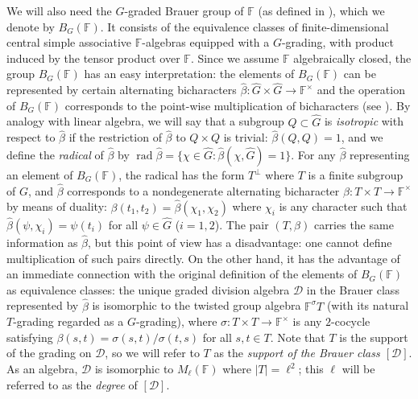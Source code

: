 \documentclass[a4paper,reqno]{amsart}
\theoremstyle{definition}
\numberwithin{theorem}{section}
\numberwithin{equation}{section}
\begin{document}
We will also need the $G$-graded Brauer group of ${\mathbb{F}}$ (as defined in \cite{PP}), which we denote by $B_G({\mathbb{F}})$. It consists of the equivalence classes of finite-dimensional central simple associative ${\mathbb{F}}$-algebras equipped with a $G$-grading, with product induced by the tensor product over ${\mathbb{F}}$. Since we assume ${\mathbb{F}}$ algebraically closed, the group $B_G({\mathbb{F}})$ has an easy interpretation: the elements of $B_G({\mathbb{F}})$ can be represented by certain alternating bicharacters $\hat{\beta}\colon{\widehat{{G}}}\times {\widehat{{G}}}\to{\mathbb{F}}^\times$ and the operation of $B_G({\mathbb{F}})$ corresponds to the point-wise multiplication of bicharacters (see \cite[\S 2]{EK_Israel}). By analogy with linear algebra, we will say that a subgroup $Q\subset{\widehat{{G}}}$ is \emph{isotropic} with respect to $\hat{\beta}$ if the restriction of $\hat{\beta}$ to $Q\times Q$ is trivial: $\hat{\beta}(Q,Q)=1$, and we define the \emph{radical} of $\hat{\beta}$ by $\operatorname{\mathrm{rad}}\hat{\beta}=\{\chi\in{\widehat{{G}}}:\hat{\beta}(\chi,{\widehat{{G}}})=1\}$. For any $\hat{\beta}$ representing an element of $B_G({\mathbb{F}})$, the radical has the form $T^\perp$ where $T$ is a finite subgroup of $G$, and $\hat{\beta}$ corresponds to a nondegenerate alternating bicharacter $\beta\colon T\times T\to{\mathbb{F}}^\times$ by means of duality: $\beta(t_1,t_2)=\hat\beta(\chi_1,\chi_2)$ where $\chi_i$ is any character such that $\hat\beta(\psi,\chi_i)=\psi(t_i)$ for all $\psi\in{\widehat{{G}}}$ ($i=1,2$). The pair $(T,\beta)$ carries the same information as $\hat{\beta}$, but this point of view has a disadvantage: one cannot define multiplication of such pairs directly. On the other hand, it has the advantage of an immediate connection with the original definition of the elements of $B_G({\mathbb{F}})$ as equivalence classes: the unique graded division algebra ${\mathcal{D}}$ in the Brauer class represented by $\hat{\beta}$ is isomorphic to the twisted group algebra ${\mathbb{F}}^\sigma T$ (with its natural $T$-grading regarded as a $G$-grading), where $\sigma\colon T\times T\to{\mathbb{F}}^\times$ is any $2$-cocycle satisfying $\beta(s,t)=\sigma(s,t)/\sigma(t,s)$ for all $s,t\in T$. Note that $T$ is the support of the grading on ${\mathcal{D}}$, so we will refer to $T$ as the \emph{support of the Brauer class $[{\mathcal{D}}]$}. As an algebra, ${\mathcal{D}}$ is isomorphic to $M_\ell({\mathbb{F}})$ where $|T|=\ell^2$; this $\ell$ will be referred to as the \emph{degree} of $[{\mathcal{D}}]$.
\end{document}
